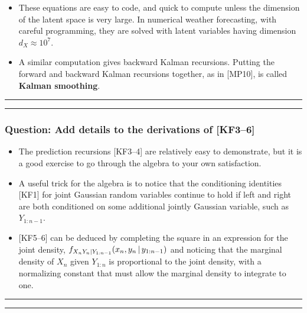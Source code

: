 \documentclass[]{article}
\begin{document}

\begin{itemize}
\item
  These equations are easy to code, and quick to compute unless the
  dimension of the latent space is very large. In numerical weather
  forecasting, with careful programming, they are solved with latent
  variables having dimension \(d_X\approx 10^7\).
\item
  A similar computation gives backward Kalman recursions. Putting the
  forward and backward Kalman recursions together, as in {[}MP10{]}, is
  called \textbf{Kalman smoothing}.
\end{itemize}

\begin{center}\rule{0.5\linewidth}{\linethickness}\end{center}

\begin{center}\rule{0.5\linewidth}{\linethickness}\end{center}

\subsubsection{Question: Add details to the derivations of
{[}KF3--6{]}}\label{question-add-details-to-the-derivations-of-kf36}

\begin{itemize}
\item
  The prediction recursions {[}KF3--4{]} are relatively easy to
  demonstrate, but it is a good exercise to go through the algebra to
  your own satisfaction.
\item
  A useful trick for the algebra is to notice that the conditioning
  identities {[}KF1{]} for joint Gaussian random variables continue to
  hold if left and right are both conditioned on some additional jointly
  Gaussian variable, such as \(Y_{1:n-1}\).
\item
  {[}KF5--6{]} can be deduced by completing the square in an expression
  for the joint density,
  \(f_{X_nY_n|Y_{1:n-1}}(x_n,y_n{\, | \,} y_{1:n-1})\) and noticing that
  the marginal density of \(X_n\) given \(Y_{1:n}\) is proportional to
  the joint density, with a normalizing constant that must allow the
  marginal density to integrate to one.
\end{itemize}

\begin{center}\rule{0.5\linewidth}{\linethickness}\end{center}

\begin{center}\rule{0.5\linewidth}{\linethickness}\end{center}
\end{document}
